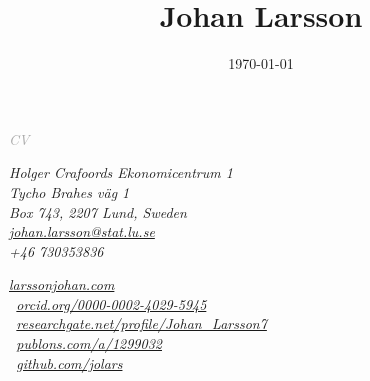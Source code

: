\documentclass[
  10pt,
  headsepline=true,
  english,
  DIV=12
]{scrartcl}
\date{\today}
\title{Johan Larsson}
\renewcommand*{%
  \mkbibnamegiven
}[1]{\ifitemannotation{highlight}{\textbf{#1}}{#1}}
\renewcommand*{%
  \mkbibnamefamily
}[1]{\ifitemannotation{highlight}{\textbf{#1}}{#1}}
\begin{document}
\begin{titlepage}
\end{titlepage}

  \begin{center}
  {\itshape \large \textcolor{darkgray}{CV}}
  \medskip

  \smallskip

  \noindent {\large \today}
  \end{center}

\baselineskip

\begin{minipage}[t]{.5\textwidth}
  \small
  \itshape
  \noindent
  Holger Crafoords Ekonomicentrum 1\\
  Tycho Brahes väg 1\\
  Box 743, 2207 Lund, Sweden
  \vspace{1ex}\\
  \href{mailto:johan.larsson@stat.lu.se}{johan.larsson@stat.lu.se}\\
  +46 730353836

\end{minipage}%
\begin{minipage}[t]{0.5\textwidth}
  \raggedleft\itshape\small
  \href{https://larssonjohan.com}{larssonjohan.com}\\
  {\aiOrcid}\, \href{https://orcid.org/0000-0002-4029-5945}{orcid.org/0000-0002-4029-5945}\\
  {\aiResearchGate}\, \href{https://www.researchgate.net/profile/Johan_Larsson7}{researchgate.net/profile/Johan\_Larsson7}\\
  {\aiPublons}\, \href{https://publons.com/a/1299032}{publons.com/a/1299032}\\
  {\faGithub}\, \href{https://github.com/jolars}{github.com/jolars}
\end{minipage}

\end{document}
